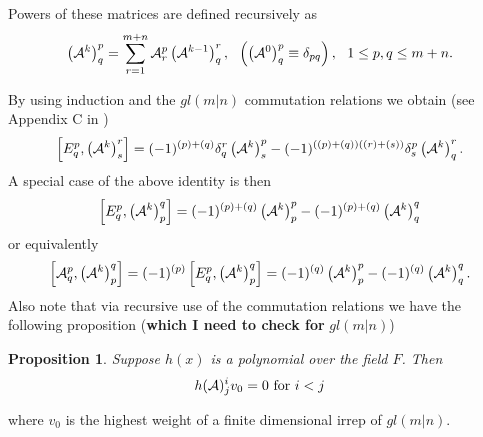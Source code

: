 \documentclass[12pt]{article}
\newtheorem{prop}[lemma]{Proposition}
\begin{document}
Powers of these matrices are defined recursively as
\begin{align*}
\left({\cal A}^k\right)^p_q = \sum_{r=1}^{m+n} {\cal A}^p_r
\left({\cal A}^{k-1}\right)^r_q, ~~\left( \left({\cal A}^0 \right)^p_q \equiv
\delta_{p q} \right), ~~ 1\leq p,q\leq m+n.  
\end{align*}

By using induction and the $gl(m|n)$ commutation relations we obtain (see Appendix C in \cite{GIW1})
\begin{align*}
\left[ E^p_q , \left({\cal A}^k\right)^r_s \right] = (-1)^{(p) + (q)}
\delta^r_q \left({\cal A}^k\right)^p_s - (-1)^{((p) + (q))((r) +
(s))} \delta^p_s \left({\cal A}^k\right)^r_q.
\end{align*}
A special case of the above identity is then
\begin{align*}
\left[ E^p_q , \left({\cal A}^k\right)^q_p \right] = (-1)^{(p) + (q)}
 \left({\cal A}^k\right)^p_p - (-1)^{(p) + (q)}  \left({\cal A}^k\right)^q_q
\end{align*}
or equivalently
\begin{align*}
\left[ {\cal A}^p_q , \left({\cal A}^k\right)^{q}_{p} \right] = (-1)^{(p)} \left[
E^p_q , \left({\cal A}^k\right)^{q}_{p} \right] = (-1)^{(q)}
 \left({\cal A}^k\right)^p_p - (-1)^{(q)}  \left({\cal A}^k\right)^q_q.
\end{align*}
Also note that via recursive use of the commutation relations we have the 
following proposition (\textbf{which I need to check for }$gl(m|n)$)
\begin{prop} \label{PolyVanish}
Suppose  $h(x)$ is a polynomial over the field $F$. Then
$$
h({\cal A})^i_j v_0 = 0 \hbox{~for~} i<j
$$
\end{prop}
where $v_0$ is the highest weight of a finite dimensional irrep of $gl(m|n)$.
\end{document}
